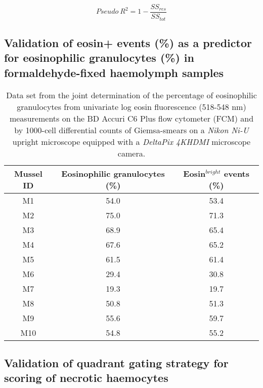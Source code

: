 \begin{equation}
\label{eq:PseudoR2}
Pseudo ~ R^2 = 1 - \dfrac{SS_{res}}{SS_{tot}}
\end{equation}


\subsection{Validation of eosin+ events (\%) as a predictor for eosinophilic granulocytes (\%) in formaldehyde-fixed haemolymph samples}

\begin{table}[H]
	\centering
	\caption{Data set from the joint determination of the percentage of eosinophilic granulocytes from univariate log eosin fluorescence (518-548 nm) measurements on the BD Accuri C6 Plus flow cytometer (FCM) and by 1000-cell differential counts of Giemsa-smears on a \emph{Nikon Ni-U} upright microscope equipped with a \emph{DeltaPix 4KHDMI} microscope camera.}
	\label{tb:LogEosin_validation}
	\begin{tabular}{ccc}
        \toprule
        Mussel ID &  Eosinophilic granulocytes (\%) & Eosin$^{bright}$ events (\%)  \\
		\midrule
M1	&	54.0    &	53.4	\\
M2	&	75.0    &	71.3	\\
M3	&	68.9	&	65.4	\\
M4	&	67.6	&	65.2	\\
M5	&	61.5	&	61.4	\\
M6	&	29.4	&	30.8	\\
M7	&	19.3	&	19.7	\\
M8	&	50.8	&	51.3	\\
M9	&	55.6	&	59.7	\\
M10	&	54.8	&	55.2	\\
   		\bottomrule
	\end{tabular}
\end{table}







\subsection{Validation of quadrant gating strategy for scoring of necrotic haemocytes}

